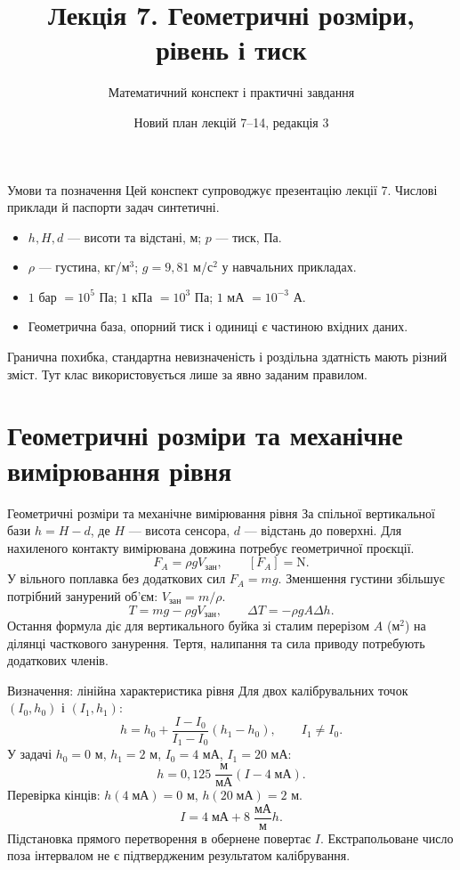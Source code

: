 \documentclass[aspectratio=169,11pt]{beamer}
\title{Лекція 7. Геометричні розміри, рівень і тиск}
\subtitle{Математичний конспект і практичні завдання}
\date{Новий план лекцій 7--14, редакція 3}
\begin{document}
\begin{frame}\titlepage\end{frame}
\begin{frame}{Умови та позначення}
Цей конспект супроводжує презентацію лекції 7. Числові приклади й паспорти задач синтетичні.
\begin{itemize}
\item $h,H,d$ --- висоти та відстані, м; $p$ --- тиск, Па.
\item $\rho$ --- густина, кг/м$^3$; $g=9{,}81$ м/с$^2$ у навчальних прикладах.
\item $1$ бар $=10^5$ Па; $1$ кПа $=10^3$ Па; $1$ мА $=10^{-3}$ А.
\item Геометрична база, опорний тиск і одиниці є частиною вхідних даних.
\end{itemize}
Гранична похибка, стандартна невизначеність і роздільна здатність мають різний зміст. Тут клас використовується лише за явно заданим правилом.
\end{frame}
\section{Геометричні розміри та механічне вимірювання рівня}
\begin{frame}{Геометричні розміри та механічне вимірювання рівня}
За спільної вертикальної бази $h=H-d$, де $H$ --- висота сенсора, $d$ --- відстань до поверхні. Для нахиленого контакту вимірювана довжина потребує геометричної проєкції.
\[
 F_A=\rho gV_{\mathrm{зан}},\qquad [F_A]=\mathrm{N}.
\]
У вільного поплавка без додаткових сил $F_A=mg$. Зменшення густини збільшує потрібний занурений об'єм: $V_{\mathrm{зан}}=m/\rho$.
\[
 T=mg-\rho gV_{\mathrm{зан}},\qquad \Delta T=-\rho gA\Delta h.
\]
Остання формула діє для вертикального буйка зі сталим перерізом $A$ (м$^2$) на ділянці часткового занурення. Тертя, налипання та сила приводу потребують додаткових членів.
\end{frame}
\begin{frame}{Визначення: лінійна характеристика рівня}
Для двох калібрувальних точок $(I_0,h_0)$ і $(I_1,h_1)$:
\[
 h=h_0+\frac{I-I_0}{I_1-I_0}(h_1-h_0),\qquad I_1\ne I_0.
\]
У задачі $h_0=0$ м, $h_1=2$ м, $I_0=4$ мА, $I_1=20$ мА:
\[
 h=0{,}125\;\frac{\mathrm{м}}{\mathrm{мА}}(I-4\;\mathrm{мА}).
\]
Перевірка кінців: $h(4\;\mathrm{мА})=0$ м, $h(20\;\mathrm{мА})=2$ м.
\[
 I=4\;\mathrm{мА}+8\;\frac{\mathrm{мА}}{\mathrm{м}}h.
\]
Підстановка прямого перетворення в обернене повертає $I$. Екстрапольоване число поза інтервалом не є підтвердженим результатом калібрування.
\end{frame}
\end{document}
